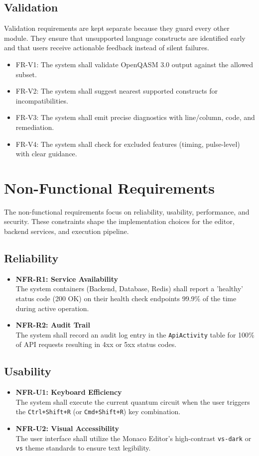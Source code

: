 \subsection{Validation}
Validation requirements are kept separate because they guard every other module. They ensure that unsupported language constructs are identified early and that users receive actionable feedback instead of silent failures.
\begin{itemize}
    \item FR-V1: The system shall validate OpenQASM 3.0 output against the allowed subset.
    \item FR-V2: The system shall suggest nearest supported constructs for incompatibilities.
    \item FR-V3: The system shall emit precise diagnostics with line/column, code, and remediation.
    \item FR-V4: The system shall check for excluded features (timing, pulse-level) with clear guidance.
\end{itemize}

\section{Non-Functional Requirements}

The non-functional requirements focus on reliability, usability, performance, and security. These constraints shape the implementation choices for the editor, backend services, and execution pipeline.

\subsection{Reliability}
\begin{itemize}
    \item \textbf{NFR-R1: Service Availability} \\
    The system containers (Backend, Database, Redis) shall report a 'healthy' status code (200 OK) on their health check endpoints 99.9\% of the time during active operation.
    \item \textbf{NFR-R2: Audit Trail} \\
    The system shall record an audit log entry in the \texttt{ApiActivity} table for 100\% of API requests resulting in 4xx or 5xx status codes.
\end{itemize}

\subsection{Usability}
\begin{itemize}
    \item \textbf{NFR-U1: Keyboard Efficiency} \\
    The system shall execute the current quantum circuit when the user triggers the \texttt{Ctrl+Shift+R} (or \texttt{Cmd+Shift+R}) key combination.
    \item \textbf{NFR-U2: Visual Accessibility} \\
    The user interface shall utilize the Monaco Editor's high-contrast \texttt{vs-dark} or \texttt{vs} theme standards to ensure text legibility.
\end{itemize}

